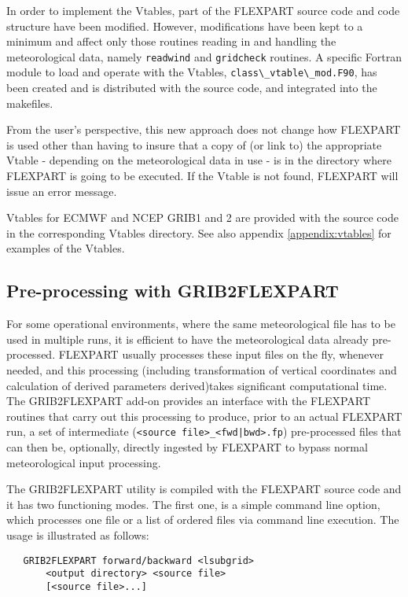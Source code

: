\documentclass{egu}                  %
\begin{document}
In order to implement the Vtables, part of the FLEXPART source code and code structure have been modified. However, modifications have been kept to a minimum and affect only those routines reading in and handling the meteorological data, namely \verb|readwind| and \verb|gridcheck| routines. A specific Fortran module to load and operate with the Vtables,  \verb|class\_vtable\_mod.F90|, has been created and is distributed with the source code, and integrated into the makefiles. 

From the user's perspective, this new approach does not change how FLEXPART is used other than having to insure that a copy of (or link to)  the appropriate Vtable - depending on the meteorological data in use - is in the directory where FLEXPART is going to be executed. If the Vtable is not found, FLEXPART will issue an error message. 

Vtables for ECMWF and NCEP GRIB1 and 2 are provided with the source code in the corresponding Vtables directory. See also appendix \ref{appendix:vtables} for examples of the Vtables.

\subsection{Pre-processing with GRIB2FLEXPART}\label{sec:preprocdata}

For some operational environments, where the same meteorological file has to be used in multiple runs, it is efficient to have the meteorological data already pre-processed. FLEXPART usually processes these input files on the fly, whenever needed, and this processing (including transformation of vertical coordinates and calculation of derived parameters derived)takes significant computational time. The GRIB2FLEXPART add-on provides an interface with the FLEXPART routines that carry out this processing to produce, prior to an actual FLEXPART run, a set of intermediate (\texttt{<source file>_<fwd|bwd>.fp}) pre-processed files that can then be, optionally, directly ingested by FLEXPART to bypass normal meteorological input processing.   

The GRIB2FLEXPART utility is compiled with the FLEXPART source code and it has two functioning modes. The first one, is a simple command line option, which  processes one file or a list of ordered files via command line execution. The usage is illustrated as follows: 


\begin{small}
\begin{verbatim}
   GRIB2FLEXPART forward/backward <lsubgrid> 
       <output directory> <source file> 
       [<source file>...]
\end{verbatim}
\end{small}
\end{document}
